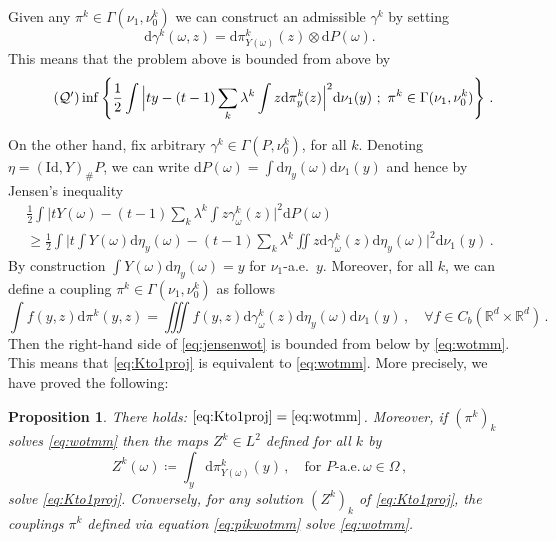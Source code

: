 \documentclass[12pt]{amsart}
\numberwithin{equation}{section}
\let\mc=\mathcal
\let\mr=\mathrm
\def\ed{\mathrm{d}}
\theoremstyle{plain}
\newtheorem{proposition}[theorem]{Proposition}
\theoremstyle{definition}
\begin{document}
Given any $\pi^k\in \Gamma(\nu_1,\nu_0^k)$ we can construct an admissible  $\gamma^k$ by setting \[ \ed \gamma^k(\omega,z) = \ed \pi^k_{Y(\omega)}(z) \otimes \ed P(\omega). \] This means that the problem above is bounded from above by
\begin{equation}\label{eq:wotmm} \tag{$\mc{Q}'$}
\inf \left\{ \frac{1}{2} \int \Big | t y - (t-1) \sum_k \lambda^k \int z \ed \pi_y^k (z)\Big |^2 \ed \nu_1(y) ~ ; ~ \pi^k \in \Gamma(\nu_1,\nu_0^k)  \right\}\,.
\end{equation}


On the other hand, fix arbitrary $\gamma^k \in \Gamma(P,\nu_0^k)$, for all $k$. Denoting $\eta = (\mr{Id}, Y)_\# P$, we can write $\ed P(\omega) = \int \ed \eta_y(\omega) \ed \nu_1(y)$ and hence by Jensen's inequality
\begin{multline}\label{eq:jensenwot}
 \frac{1}{2} \int \Big | t Y(\omega) - (t-1) \sum_k \lambda^k \int z \gamma_\omega^k (z)\Big |^2 \ed P(\omega) \\\geq  \frac{1}{2} \int \Big | t \int Y(\omega) \ed \eta_y(\omega) - (t-1) \sum_k \lambda^k \iint z \ed \gamma_\omega^k (z) \ed \eta_y(\omega) \Big |^2 \ed \nu_1 (y)\,.
 \end{multline}
 By construction $\int Y(\omega) \ed \eta_y(\omega) = y$ for $\nu_1$-a.e.\ $y$. Moreover, for all $k$, we can define a coupling $\pi^k \in \Gamma(\nu_1,\nu_0^k)$ as follows
 \begin{equation}\label{eq:pikwotmm}
 \int f(y,z) \ed \pi^k(y,z) = \iiint f(y,z) \ed \gamma^k_\omega(z) \ed \eta_y(\omega)  \ed \nu_1(y)\,, \quad \forall f\in C_b(\mathbb{R}^d\times \mathbb{R}^d)\,.
 \end{equation}
 Then the right-hand side of \eqref{eq:jensenwot} is bounded from below by \eqref{eq:wotmm}.
This means that \eqref{eq:Kto1proj} is equivalent to \eqref{eq:wotmm}. More precisely, we have proved the following:
\begin{proposition}\label{prop:projwot}
There holds: $\eqref{eq:Kto1proj} = \eqref{eq:wotmm}$.  Moreover, if $(\pi^k)_k$ solves \eqref{eq:wotmm} then the maps $Z^k \in L^2$ defined for all $k$ by
\[
Z^k(\omega) \coloneqq \int_y \ed \pi^k_{Y(\omega)}(y) \,, \quad \text{for } P\text{-a.e.}\, \omega \in \Omega\,,
\]
solve \eqref{eq:Kto1proj}. Conversely, for any solution $(Z^k)_k$ of \eqref{eq:Kto1proj}, the couplings $\pi^k$ defined via equation \eqref{eq:pikwotmm} solve \eqref{eq:wotmm}.
\end{proposition}
\end{document}

